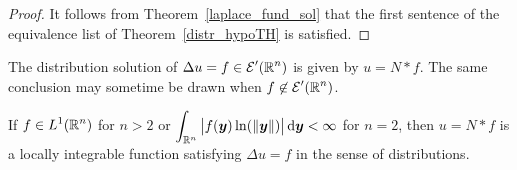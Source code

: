 \begin{proof}
It follows from Theorem~\ref{laplace_fund_sol} that
the first sentence of the equivalence list of Theorem~\ref{distr_hypoTH} is
satisfied.
\end{proof}

The distribution solution of $\displaystyle \Delta u = f \in \mathcal{E}'(\mathbb{R}^n)$
is given by $u = N \ast f$.  The same conclusion may sometime be drawn when
$\displaystyle f \not\in \mathcal{E}'(\mathbb{R}^n)$.

\begin{theorem} \label{laplace_not_EEp}
If $\displaystyle f \in L^1(\mathbb{R}^n)$ for $n>2$ or
$\displaystyle \int_{\mathbb{R}^n} \big|f({\bm{y}}) \ln(\|{\bm{y}}\|)\big|
\,\mathrm{d}{{\bm{y}}}<\infty$ for $n=2$, then $u= N\ast f$ is a locally
integrable function satisfying $\Delta u = f$ in the sense of
distributions.
\end{theorem}

